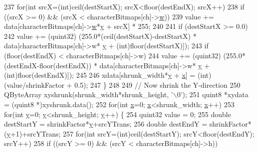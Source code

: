 \begin{DoxyCode}
{237         \textcolor{keywordflow}{for}(\textcolor{keywordtype}{int} srcX=(\textcolor{keywordtype}{int})ceil(destStartX); srcX<floor(destEndX); srcX++)
238           \textcolor{keywordflow}{if} ((srcX >= 0) && (srcX < characterBitmaps[ch]->\hyperlink{structbitmap_a955acbe13f247a259cbe10ced3a212fd}{w}))
239             value += data[characterBitmaps[ch]->\hyperlink{structbitmap_a955acbe13f247a259cbe10ced3a212fd}{w}*\hyperlink{classglyph_ac9b8f10a7be77024f34c723eeea34bf3}{y} + srcX] * 255;
240 
241         \textcolor{keywordflow}{if} (destStartX >= 0.0)
242           value += (quint32) (255.0*(ceil(destStartX)-destStartX) * data[characterBitmaps[ch]->w*
      \hyperlink{classglyph_ac9b8f10a7be77024f34c723eeea34bf3}{y} + (\textcolor{keywordtype}{int})floor(destStartX)]);
243         \textcolor{keywordflow}{if} (floor(destEndX) < characterBitmaps[ch]->w)
244           value += (quint32) (255.0*(destEndX-floor(destEndX)) * data[characterBitmaps[ch]->w*
      \hyperlink{classglyph_ac9b8f10a7be77024f34c723eeea34bf3}{y} + (\textcolor{keywordtype}{int})floor(destEndX)]);
245 
246         xdata[shrunk\_width*\hyperlink{classglyph_ac9b8f10a7be77024f34c723eeea34bf3}{y} + \hyperlink{classglyph_aa030c1619dd07d04f843c5ee9a54dde1}{x}] = (int)(value/shrinkFactor + 0.5);
247       \}
248 
249     \textcolor{comment}{// Now shrink the Y-direction}
250     QByteArray xyshrunk(shrunk\_width*shrunk\_height, \textcolor{charliteral}{'\(\backslash\)0'});
251     quint8 *xydata = (quint8 *)xyshrunk.data();
252     \textcolor{keywordflow}{for}(\textcolor{keywordtype}{int} \hyperlink{classglyph_aa030c1619dd07d04f843c5ee9a54dde1}{x}=0; \hyperlink{classglyph_aa030c1619dd07d04f843c5ee9a54dde1}{x}<shrunk\_width; \hyperlink{classglyph_aa030c1619dd07d04f843c5ee9a54dde1}{x}++)
253       \textcolor{keywordflow}{for}(\textcolor{keywordtype}{int} \hyperlink{classglyph_ac9b8f10a7be77024f34c723eeea34bf3}{y}=0; \hyperlink{classglyph_ac9b8f10a7be77024f34c723eeea34bf3}{y}<shrunk\_height; \hyperlink{classglyph_ac9b8f10a7be77024f34c723eeea34bf3}{y}++) \{
254         quint32 value = 0;
255         \textcolor{keywordtype}{double} destStartY = shrinkFactor*\hyperlink{classglyph_ac9b8f10a7be77024f34c723eeea34bf3}{y}+srcYTrans;
256         \textcolor{keywordtype}{double} destEndY   = shrinkFactor*(\hyperlink{classglyph_ac9b8f10a7be77024f34c723eeea34bf3}{y}+1)+srcYTrans;
257         \textcolor{keywordflow}{for}(\textcolor{keywordtype}{int} srcY=(\textcolor{keywordtype}{int})ceil(destStartY); srcY<floor(destEndY); srcY++)
258           \textcolor{keywordflow}{if} ((srcY >= 0) && (srcY < characterBitmaps[ch]->h))
}
\end{DoxyCode}
